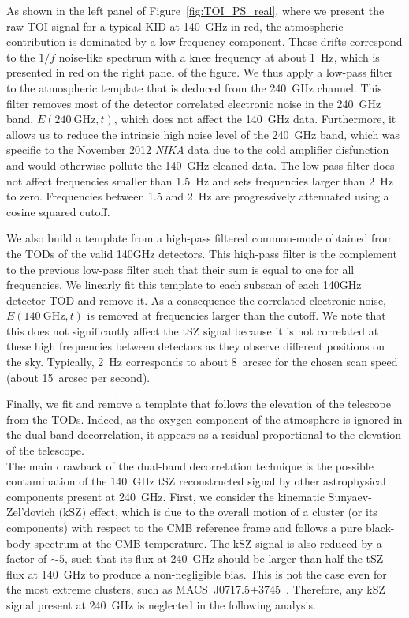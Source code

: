As shown in the left panel of Figure~\ref{fig:TOI_PS_real}, where we present the raw TOI signal for a typical KID at 140~GHz in red, the atmospheric contribution is dominated by a low frequency component. These drifts correspond to the $1/f$ noise-like spectrum with a knee frequency at about 1~Hz, which is presented in red on the right panel of the figure. We thus apply a low-pass filter to the atmospheric template that is deduced from the 240~GHz channel. This filter removes most of the detector correlated electronic noise in the 240~GHz band, $E(240 \ \mathrm{GHz}, t)$, which does not affect the 140~GHz data.  Furthermore, it allows us to reduce the intrinsic high noise level of the 240~GHz band, which was specific to the November 2012 {\it NIKA} data due to the cold amplifier disfunction and would otherwise pollute the 140~GHz cleaned data. The low-pass filter does not affect frequencies smaller than 1.5~Hz and sets frequencies larger than 2~Hz to zero. Frequencies between 1.5 and 2~Hz are progressively attenuated using a cosine squared cutoff. 

We also build a template from a high-pass filtered common-mode obtained from the TODs of the valid 140GHz detectors. This high-pass filter is the complement to the previous low-pass filter such that their sum is equal to one for all frequencies. We linearly fit this template to each subscan of each 140GHz detector TOD and remove it. As a consequence the correlated electronic noise, $E(140 \ \mathrm{GHz}, t)$ is removed at frequencies larger than the cutoff. We note that this does not significantly affect the tSZ signal because it is not correlated at these high frequencies between detectors as they observe different positions on the sky. Typically, 2~Hz corresponds to about 8~arcsec for the chosen scan speed (about 15~arcsec per second).

Finally, we fit and remove a template that follows the elevation of the telescope from the TODs. Indeed, as the oxygen component of the atmosphere is ignored in the dual-band decorrelation, it appears as a residual proportional to the elevation of the telescope.  \\

The main drawback of the dual-band decorrelation technique is the possible contamination of the 140~GHz tSZ reconstructed signal by other astrophysical components present at 240~GHz. First, we consider the kinematic Sunyaev-Zel'dovich (kSZ) effect, which is due to the overall motion of a cluster (or its components) with respect to the CMB reference frame and follows a pure black-body spectrum at the CMB temperature. The kSZ signal is also reduced by a factor of $\sim 5$, such that its flux at 240~GHz should be larger than half the tSZ flux at 140~GHz to produce a non-negligible bias. This is not the case even for the most extreme clusters, such as \mbox{MACS~J0717.5+3745}~\citep{mroczkowski_2012, sayers2013}. Therefore, any kSZ signal present at 240~GHz is neglected in the following analysis.

